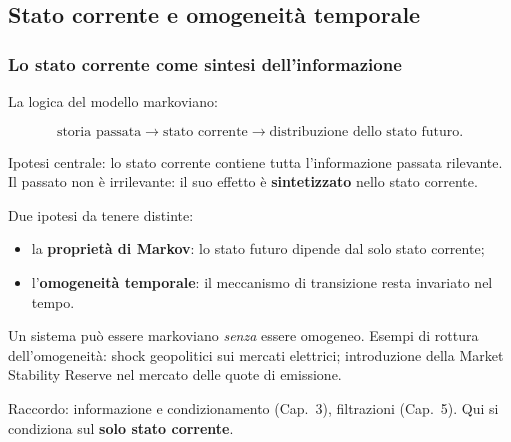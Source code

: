 \documentclass[handout]{beamer}%
\newenvironment{stepitemize}{\begin{itemize}[<+->]}{\end{itemize} }
\providecommand{\QTR}[2]{\csname #1\endcsname{#2}}
\begin{document}


\subsection{Stato corrente e omogeneit\`{a} temporale}%

\begin{frame}%
%

\frametitle{Lo stato corrente come sintesi dell'informazione}%
%

%


La logica del modello markoviano:%

\[
\text{storia passata} \longrightarrow\text{stato corrente} \longrightarrow
\text{distribuzione dello stato futuro}.
\]


Ipotesi centrale: lo stato corrente contiene tutta l'informazione passata
rilevante. Il passato non \`{e} irrilevante: il suo effetto \`{e}
\textbf{sintetizzato} nello stato corrente.

\medskip

Due ipotesi da tenere distinte:

\begin{stepitemize}
\item la \textbf{propriet\`{a} di Markov}: lo stato futuro dipende dal solo
stato corrente;

\item l'\textbf{omogeneit\`{a} temporale}: il meccanismo di transizione resta
invariato nel tempo.
\end{stepitemize}

\medskip

Un sistema pu\`{o} essere markoviano \emph{senza} essere omogeneo. Esempi di
rottura dell'omogeneit\`{a}: shock geopolitici sui mercati elettrici;
introduzione della Market Stability Reserve nel mercato delle quote di emissione.

\medskip

\begin{center}
{\small Raccordo: informazione e condizionamento (Cap.~3), filtrazioni
(Cap.~5). Qui si condiziona sul \textbf{solo stato corrente}.}
\end{center}%

\transboxout
\end{frame}%
\end{document}
